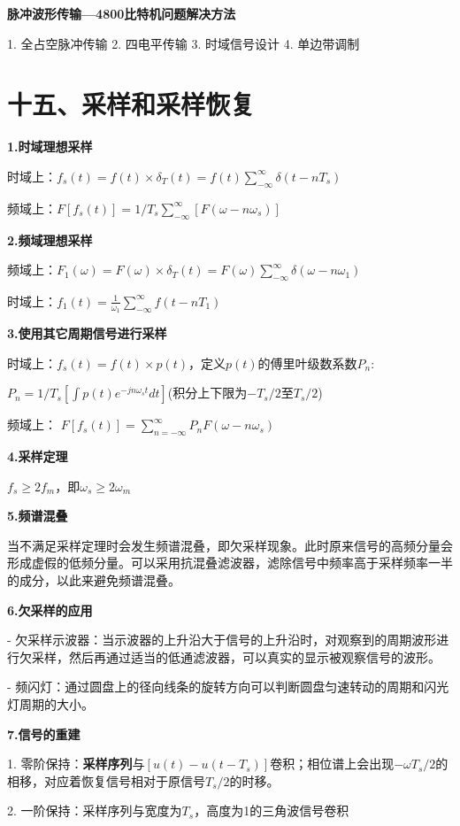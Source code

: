 \textbf{脉冲波形传输—4800比特机问题解决方法}

1. 全占空脉冲传输    2. 四电平传输    3. 时域信号设计    4. 单边带调制

\section*{十五、采样和采样恢复}

\textbf{1.时域理想采样}

时域上：$f_s(t)=f(t)\times\delta_T(t)=f(t)\sum\limits^{\infty}_{-\infty}\delta(t-nT_s)$

频域上：$F[f_s(t)]=1/T_s\sum\limits^{\infty}_{-\infty}[F(\omega-n\omega_s)]$

\textbf{2.频域理想采样}

频域上：$F_1(\omega)=F(\omega)\times\delta_T(t)=F(\omega)\sum\limits^{\infty}_{-\infty}\delta(\omega-n\omega_1)$

时域上：$f_1(t)=\frac{1}{\omega_1}\sum\limits^{\infty}_{-\infty}f(t-nT_1)$

\textbf{3.使用其它周期信号进行采样}

时域上：$f_s(t)=f(t)\times p(t)$，定义$p(t)$的傅里叶级数系数$P_n$:

$P_n=1/T_s[\int p(t)e^{-jn\omega_st}dt]$(积分上下限为$-T_s/2$至$T_s/2$)

频域上： $F[f_s(t)]=\sum\limits_{n=-\infty}^{\infty}P_nF(\omega-n\omega_s)$

\textbf{4.采样定理}

$f_s\geq2f_m$，即$\omega_s\geq 2\omega_m$

\textbf{5.频谱混叠}

当不满足采样定理时会发生频谱混叠，即欠采样现象。此时原来信号的高频分量会形成虚假的低频分量。可以采用抗混叠滤波器，滤除信号中频率高于采样频率一半的成分，以此来避免频谱混叠。

\textbf{6.欠采样的应用}

- 欠采样示波器：当示波器的上升沿大于信号的上升沿时，对观察到的周期波形进行欠采样，然后再通过适当的低通滤波器，可以真实的显示被观察信号的波形。

- 频闪灯：通过圆盘上的径向线条的旋转方向可以判断圆盘匀速转动的周期和闪光灯周期的大小。

\textbf{7.信号的重建}

1. 零阶保持：\textbf{采样序列}与$[u(t)-u(t-T_s)]$卷积；相位谱上会出现$-\omega T_s/2$的相移，对应着恢复信号相对于原信号$T_s/2$的时移。

2. 一阶保持：采样序列与宽度为$T_s$，高度为1的三角波信号卷积

